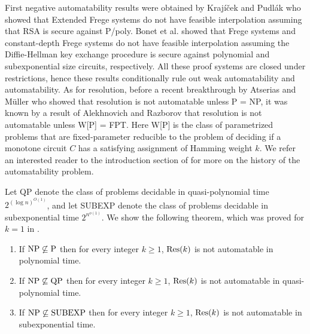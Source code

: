 First negative automatability results were obtained by Kraj\'{i}\v{c}ek and Pudl\'{a}k \cite{Krajicek-Pudlak1998} who showed that Extended Frege systems  do not have feasible interpolation assuming that RSA is secure against P/poly. Bonet et al. \cite{Bonet-Pitassi-Raz,Bonet-Domingo-Gavalda-Maciel-Pitassi-Raz2004} showed that Frege systems and constant-depth Frege systems do not have feasible interpolation assuming the Diffie-Hellman key exchange procedure is secure against polynomial and subexponential size circuits, respectively. All these proof systems are closed under restrictions, hence these results conditionally rule out weak automatability and automatability. 
As for resolution, before a recent breakthrough by Atserias and M\"uller \cite{atserias-muller2019-focs} who showed that resolution is not automatable unless P = NP, it was known by a result of Alekhnovich and Razborov \cite{Alekhnovich-Razborov2008} that resolution is not automatable unless W[P] = FPT. Here W[P] is the class of parametrized problems that are fixed-parameter reducible to the problem of deciding if a monotone circuit $C$ has a satisfying assignment of Hamming weight $k$. We refer an interested reader to the introduction section of \cite{atserias-muller2019-focs} for more on the history of the automatability problem.

Let QP denote the class of problems decidable in quasi-polynomial time $2^{(\log n)^{O(1)}}$, and let SUBEXP denote the class of problems decidable in subexponential time $2^{n^{o(1)}}$. We show the following theorem, which was proved for $k=1$ in \cite{atserias-muller2019-focs}.

\begin{theorem}
\label{thm:res(k)-not_automatable} 
\begin{enumerate}[1.]
\item If $\textnormal{NP} \not \subseteq \textnormal{P}$ then for every integer $k \geq 1$, $\textnormal{Res}(k)$ is not automatable in polynomial time.
\item If $\textnormal{NP} \not \subseteq \textnormal{QP}$ then for every integer $k \geq 1$, $\textnormal{Res}(k)$ is not automatable in quasi-polynomial time.
\item If $\textnormal{NP} \not \subseteq \textnormal{SUBEXP}$ then for every integer $k \geq 1$, $\textnormal{Res}(k)$ is not automatable in subexponential time.
\end{enumerate}
\end{theorem}

